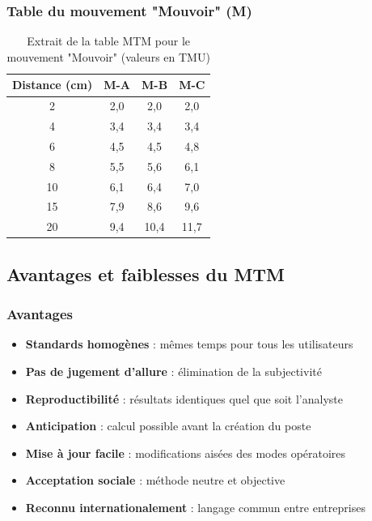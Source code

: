 \documentclass[a4paper,12pt]{article}
\begin{document}
\subsubsection{Table du mouvement "Mouvoir" (M)}

\begin{table}[ht]
\centering
\begin{tabular}{|c|c|c|c|}
\hline
\textbf{Distance (cm)} & \textbf{M-A} & \textbf{M-B} & \textbf{M-C} \\
\hline
2 & 2,0 & 2,0 & 2,0 \\
4 & 3,4 & 3,4 & 3,4 \\
6 & 4,5 & 4,5 & 4,8 \\
8 & 5,5 & 5,6 & 6,1 \\
10 & 6,1 & 6,4 & 7,0 \\
15 & 7,9 & 8,6 & 9,6 \\
20 & 9,4 & 10,4 & 11,7 \\
\hline
\end{tabular}
\caption{Extrait de la table MTM pour le mouvement "Mouvoir" (valeurs en TMU)}
\end{table}

\subsection{Avantages et faiblesses du MTM}

\subsubsection{Avantages}

\begin{itemize}
    \item \textbf{Standards homogènes} : mêmes temps pour tous les utilisateurs
    \item \textbf{Pas de jugement d'allure} : élimination de la subjectivité
    \item \textbf{Reproductibilité} : résultats identiques quel que soit l'analyste
    \item \textbf{Anticipation} : calcul possible avant la création du poste
    \item \textbf{Mise à jour facile} : modifications aisées des modes opératoires
    \item \textbf{Acceptation sociale} : méthode neutre et objective
    \item \textbf{Reconnu internationalement} : langage commun entre entreprises
\end{itemize}
\end{document}
